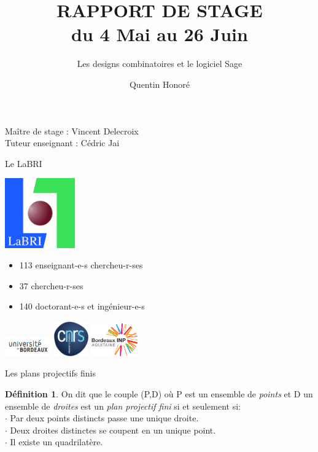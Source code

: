 \documentclass[10pt]{beamer}
\title{\huge RAPPORT DE STAGE \\ \normalsize du 4 Mai au 26 Juin}
\subtitle{\large Les designs combinatoires et le logiciel Sage}
\author{\large Quentin Honoré}
\institute{\large LaBRI}
\date{}
\theoremstyle{definition}
\newtheorem{Def}{Définition}[section]
\begin{document}
\begin{frame}
  \titlepage
      {\footnotesize Maître de stage : Vincent Delecroix\\
        Tuteur enseignant : Cédric Jai}
\end{frame}


\begin{frame}
    {\Huge Le LaBRI}
  \begin{minipage}{0.3\linewidth}
    \includegraphics[height=3cm]{labri.jpg}
  \end{minipage}
  \begin{minipage}{0.65\linewidth}
    \begin{itemize}
    \item 113 enseignant-e-s chercheu-r-ses
    \item 37 chercheu-r-ses
      \item 140 doctorant-e-s et ingénieur-e-s
    \end{itemize}
    
    \includegraphics[width=2cm]{univbdx.jpg}\;
    \includegraphics[height=1.5cm]{cnrs.png}\;
    \includegraphics[width=2cm]{inp.PNG}
    \end{minipage}
\end{frame}


\begin{frame}
{\Huge Les plans projectifs finis}
\begin{Def}
On dit que le couple (P,D) où P est un ensemble de \emph{points} et D un ensemble de \emph{droites} est un \emph{plan projectif fini} si et seulement si:\medskip \\
$\cdot$ Par deux points distincts passe une unique droite. \\
$\cdot$ Deux droites distinctes se coupent en un unique point. \\
$\cdot$ Il existe un quadrilatère.
\end{Def}
\end{frame}
\end{document}
